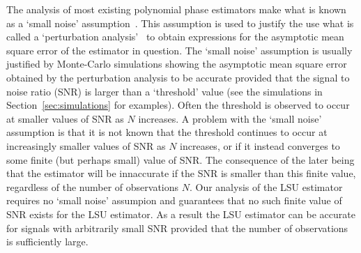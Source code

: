\documentclass[journal]{IEEEtran}
\begin{document}
The analysis of most existing polynomial phase estimators make what is known as a `small noise' assumption~\cite{Peleg_linear_FM,Oshea_cpf_2004,Djurovic_haf_cpf_2012,Djuric_phase_unwrap_chirp_1990,Barbarossa_analysis_of_PPS_1997,Barbarossa_PHAF_1998}.  %
This assumption is used to justify the use what is called a `perturbation analysis'~\cite{Porat_asympt_HAF_DPT_1996,Peleg_linear_FM,Oshea_cpf_2004,Djurovic_haf_cpf_2012,Djuric_phase_unwrap_chirp_1990,Barbarossa_analysis_of_PPS_1997,Barbarossa_PHAF_1998} to obtain expressions for the asymptotic mean square error of the estimator in question.  The `small noise' assumption is usually justified by Monte-Carlo simulations showing the asymptotic mean square error obtained by the perturbation analysis to be accurate provided that the signal to noise ratio (SNR) is larger than a `threshold' value (see the simulations in Section~\ref{sec:simulations} for examples).  Often the threshold is observed to occur at smaller values of SNR as $N$ increases.  A problem with the `small noise' assumption is that it is not known that the threshold continues to occur at increasingly smaller values of SNR as $N$ increases, or if it instead converges to some finite (but perhaps small) value of SNR.  The consequence of the later being that the estimator will be innaccurate if the SNR is smaller than this finite value, regardless of the number of observations $N$.  Our analysis of the LSU estimator requires no `small noise' assumpion and guarantees that no such finite value of SNR exists for the LSU estimator.  As a result the LSU estimator can be accurate for signals with arbitrarily small SNR provided that the number of observations is sufficiently large.
\end{document}
